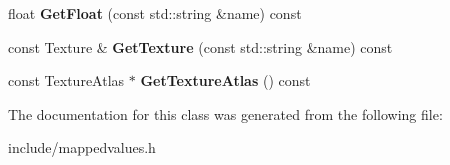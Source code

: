 \begin{DoxyCompactItemize}
\item 
\hypertarget{class_mapped_values_a8108f8905d63f905ba9a151c089c07b8}{}float {\bfseries Get\+Float} (const std\+::string \&name) const \label{class_mapped_values_a8108f8905d63f905ba9a151c089c07b8}

\item 
\hypertarget{class_mapped_values_af478684f2e7bcb902b022d5b94ecc0e0}{}const Texture \& {\bfseries Get\+Texture} (const std\+::string \&name) const \label{class_mapped_values_af478684f2e7bcb902b022d5b94ecc0e0}

\item 
\hypertarget{class_mapped_values_a30396392d47eefcbf189e71a8c97c968}{}const Texture\+Atlas $\ast$ {\bfseries Get\+Texture\+Atlas} () const \label{class_mapped_values_a30396392d47eefcbf189e71a8c97c968}

\end{DoxyCompactItemize}


The documentation for this class was generated from the following file\+:\begin{DoxyCompactItemize}
\item 
include/mappedvalues.\+h\end{DoxyCompactItemize}
